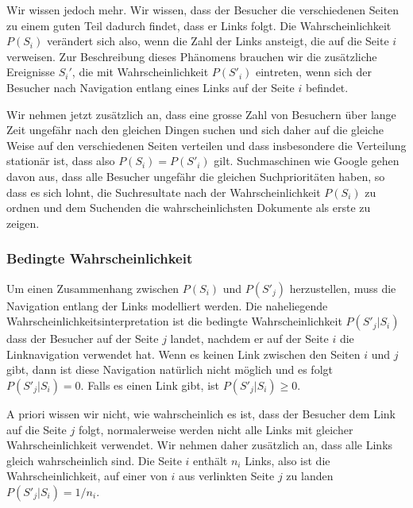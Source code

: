 Wir wissen jedoch mehr.
Wir wissen, dass der Besucher die verschiedenen Seiten zu einem guten 
Teil dadurch findet, dass er Links folgt.
Die Wahrscheinlichkeit $P(S_i)$ verändert sich also, wenn die Zahl der
Links ansteigt, die auf die Seite $i$ verweisen.
Zur Beschreibung dieses Phänomens brauchen wir die zusätzliche Ereignisse
$S_i'$, die mit Wahrscheinlichkeit $P(S'_i)$ eintreten, wenn sich der
Besucher nach Navigation entlang eines Links auf der Seite $i$ befindet.

Wir nehmen jetzt zusätzlich an, dass eine grosse Zahl von Besuchern über
lange Zeit ungefähr nach den gleichen Dingen suchen und sich daher
auf die gleiche Weise auf den verschiedenen Seiten verteilen und dass
insbesondere die Verteilung stationär ist, dass also $P(S_i) = P(S'_i)$
gilt.
Suchmaschinen wie Google gehen davon aus, dass alle Besucher ungefähr
die gleichen Suchprioritäten haben, so dass es sich lohnt, die Suchresultate
nach der Wahrscheinlichkeit $P(S_i)$ zu ordnen und dem Suchenden die
wahrscheinlichsten Dokumente als erste zu zeigen.

\subsubsection{Bedingte Wahrscheinlichkeit}
Um einen Zusammenhang zwischen $P(S_i)$ und $P(S'_j)$ herzustellen, muss
die Navigation entlang der Links modelliert werden.
Die naheliegende Wahrscheinlichkeitsinterpretation ist die bedingte
Wahrscheinlichkeit $P(S'_j|S_i)$ dass der Besucher auf der Seite $j$
landet, nachdem er auf der Seite $i$ die Linknavigation verwendet hat.
Wenn es keinen Link zwischen den Seiten $i$ und $j$ gibt, dann ist diese
Navigation natürlich nicht möglich und es folgt $P(S'_j|S_i)=0$.
Falls es einen Link gibt, ist $P(S'_j|S_i)\ge 0$.

A priori wissen wir nicht, wie wahrscheinlich es ist, dass der Besucher
dem Link auf die Seite $j$ folgt, normalerweise werden nicht alle
Links mit gleicher Wahrscheinlichkeit verwendet.
Wir nehmen daher zusätzlich an, dass alle Links gleich wahrscheinlich
sind.
Die Seite $i$ enthält $n_i$ Links, also ist die Wahrscheinlichkeit,
auf einer von $i$ aus verlinkten Seite $j$ zu landen $P(S'_j|S_i) = 1/n_i$.

